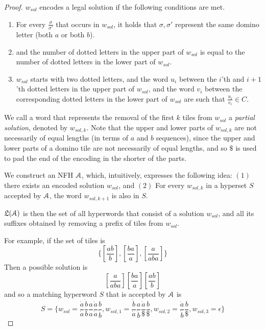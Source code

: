 \begin{proof}
$w_{sol}$ encodes a legal solution if the following conditions are met.
\begin{enumerate}
    \item For every $ \frac{\sigma}{\sigma'}  $ that occurs in $w_{sol}$, it holds that $\sigma,\sigma'$ represent the same domino letter (both $a$ or both $b$).
    \item and the number of dotted letters in the upper part of $w_{sol}$ is equal to the number of dotted letters in the lower part of $w_{sol}$.
    \item $w_{sol}$ starts with two dotted letters, and the word $u_i$ between the $i$'th and $i+1$'th dotted letters in the upper part of $w_{sol}$, and the word $v_i$ between the corresponding dotted letters in the lower part of $w_{sol}$ are such that $ \frac{u_i}{v_i}  \in C$.
\end{enumerate}

We call a word that represents the removal of the first $k$ tiles from $w_{sol}$ a {\em partial solution}, denoted by $w_{sol,k}$.
Note that the upper and lower parts of $w_{sol,k}$ are not necessarily of equal lengths (in terms of $a$ and $b$ sequences), since the upper and lower parts of a domino tile are not necessarily of equal lengths, and so $\$$ is used to pad the end of the encoding in the shorter of the parts. 

We construct an NFH $\mathcal{A}$, which, intuitively, expresses the following idea: $(1)$ there exists an encoded solution $w_{sol}$, and $(2)$ For every $w_{sol,k}$ in a hyperset $S$ accepted by $\mathcal{A}$, the word $w_{sol,k+1}$ is also in $S$. 

$\mathfrak{L}(\mathcal{A})$ is then the set of all hyperwords that consist of a solution $w_{sol}$, and all its suffixes obtained by removing a prefix of tiles from $w_{sol}$.  

For example, if the set of tiles is 
$$ \{ [\frac{ab}{b}], [\frac{ba}{a}],[\frac{a}{aba}] \} $$
Then a possible solution is 
$$ [\frac{a}{aba}][\frac{ba}{a}] [\frac{ab}{b} ]  $$
and so a matching hyperword $S$ that is accepted by $\mathcal{A}$ is
$$ S = \{  w_{sol} = \frac{\dot a}{\dot a}   \frac{\dot b}{b}   \frac{a}{a}   \frac{\dot a}{\dot a}   \frac{b}{\dot b} ,
w_{sol,1} = \frac{\dot b}{\dot a}\frac{a}{\dot b}\frac{\dot a}{\$}\frac{b}{\$}, w_{sol,2} = \frac{\dot a}{\dot b}\frac{b}{\$}, w_{sol,3} = \epsilon
\} $$


\end{proof}

